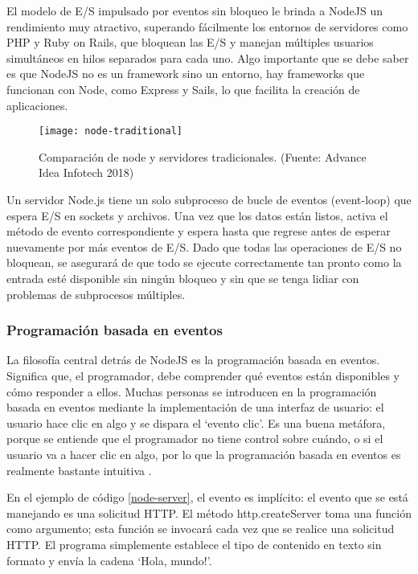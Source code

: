 El modelo de E/S impulsado por eventos sin bloqueo le brinda a NodeJS un rendimiento muy atractivo, superando fácilmente los entornos de servidores como PHP y Ruby on Rails, que bloquean las E/S y manejan múltiples usuarios simultáneos en hilos separados para cada uno. Algo importante que se debe saber es que NodeJS no es un \gls{framework} sino un entorno, hay \glspl{framework} que funcionan con Node, como Express y Sails, lo que facilita la creación de aplicaciones.
\vspace{0.8cm}

\begin{figure}[H]
  \centering
  \texttt{[image: node-traditional]}
  \caption{Comparación de node y servidores tradicionales. (Fuente: Advance Idea Infotech 2018)}
\end{figure}

Un servidor Node.js tiene un solo subproceso de bucle de eventos (event-loop) que espera E/S en sockets y archivos. Una vez que los datos están listos, activa el método de evento correspondiente y espera hasta que regrese antes de esperar nuevamente por más eventos de E/S. Dado que todas las operaciones de E/S no bloquean, se asegurará de que todo se ejecute correctamente tan pronto como la entrada esté disponible sin ningún bloqueo y sin que se tenga lidiar con problemas de subprocesos múltiples.

\newpage
\subsubsection{Programación basada en eventos}
La filosofía central detrás de NodeJS es la programación basada en eventos. Significa que, el programador,  debe comprender qué eventos están disponibles y cómo responder a ellos. Muchas personas se introducen en la programación basada en eventos mediante la implementación de una interfaz de usuario: el usuario hace clic en algo y se dispara el `evento clic'. Es una buena metáfora, porque se entiende que el programador no tiene control sobre cuándo, o si el usuario va a hacer clic en algo, por lo que la programación basada en eventos es realmente bastante intuitiva \cite{ethan}.
\vspace{0.8cm}


En el ejemplo de código \ref{node-server}, el evento es implícito: el evento que se está manejando es una solicitud HTTP. El método http.createServer toma una función como argumento; esta función se invocará cada vez que se realice una solicitud HTTP. El programa simplemente establece el tipo de contenido en texto sin formato y envía la cadena `Hola, mundo!'.
